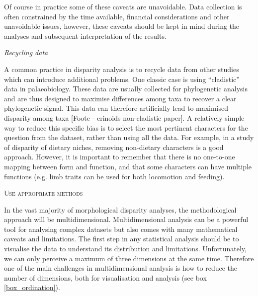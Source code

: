 \documentclass[12pt,letterpaper]{article}
\renewcommand{\section}[1]{%
\bigskip
\begin{center}
\begin{Large}
\normalfont\scshape #1
\medskip
\end{Large}
\end{center}}
\renewcommand{\subsection}[1]{%
\bigskip
\begin{center}
\begin{large}
\normalfont\itshape #1
\end{large}
\end{center}}
\begin{document}
Of course in practice some of these caveats are unavoidable. 
Data collection is often constrained by the time available, financial considerations and other unavoidable issues, however, these caveats should be kept in mind during the analyses and subsequent interpretation of the results. %

\subsection{Recycling data}
A common practice in disparity analysis is to recycle data from other studies which can introduce additional problems.
One classic case is using ``cladistic'' data in palaeobiology.
These data are usually collected for phylogenetic analysis and are thus designed to maximise differences among taxa to recover a clear phylogenetic signal.
This data can therefore artificially lead to maximised disparity among taxa [Foote - crinoids non-cladistic paper].
A relatively simple way to reduce this specific bias is to select the most pertinent characters for the question from the dataset, rather than using all the data.
For example, in a study of disparity of dietary niches, removing non-dietary characters is a good approach.
However, it is important to remember that there is no one-to-one mapping between form and function, and that some characters can have multiple functions (e.g. limb traits can be used for both locomotion and feeding).

\section{Use appropriate methods} 
In the vast majority of morphological disparity analyses, the methodological approach will be multidimensional.
Multidimensional analysis can be a powerful tool for analysing complex datasets but also comes with many mathematical caveats and limitations.
The first step in any statistical analysis should be to visualise the data to understand its distribution and limitations.
Unfortunately, we can only perceive a maximum of three dimensions at the same time.
Therefore one of the main challenges in multidimensional analysis is how to reduce the number of dimensions, both for visualisation and analysis (see box \ref{box_ordination}).
\end{document}
